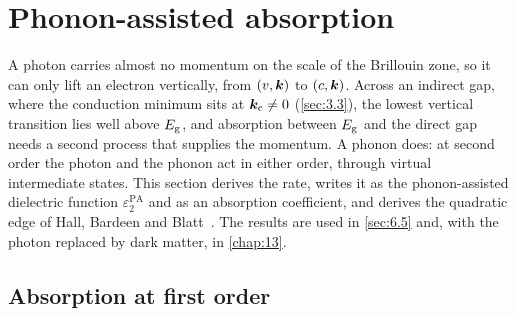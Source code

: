 \section{Phonon-assisted absorption}\label{app:D.18}

A photon carries almost no momentum on the scale of the Brillouin zone, so it can only lift an electron vertically, from $(v,\bm{k})$ to $(c,\bm{k})$. Across an indirect gap, where the conduction minimum sits at $\bm{k}_{\mathrm{c}} \ne 0$ (\cref{sec:3.3}), the lowest vertical transition lies well above $E_{\mathrm{g}}$, and absorption between $E_{\mathrm{g}}$ and the direct gap needs a second process that supplies the momentum. A phonon does: at second order the photon and the phonon act in either order, through virtual intermediate states. This section derives the rate, writes it as the phonon-assisted dielectric function $\varepsilon_2^{\mathrm{PA}}$ and as an absorption coefficient, and derives the quadratic edge of Hall, Bardeen and Blatt~\cite{hall1954infrared}. The results are used in \cref{sec:6.5} and, with the photon replaced by dark matter, in \cref{chap:13}.

\subsection*{Absorption at first order}

